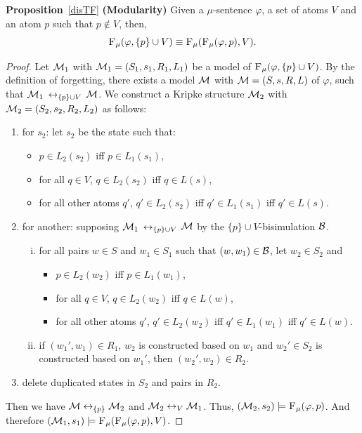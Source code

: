 \documentclass[runningheads]{llncs}
\begin{document}
\noindent\textbf{Proposition}~\ref{disTF} \textbf{(Modularity)} Given a $\mu$-sentence $\varphi$, a set of atoms $V$ and an atom $p$ such that $p \notin V$, then,
 \[
 {\textsc{F}_{\textsc{$\mu$}}}(\varphi, \{p\} \cup V) \equiv {\textsc{F}_{\textsc{$\mu$}}}({\textsc{F}_{\textsc{$\mu$}}}(\varphi, p), V).
 \]
 \begin{proof}
 Let ${\cal M}_1 $ with ${\cal M}_1=(S_1, s_1, R_1, L_1)$ be a model of ${\textsc{F}_{\textsc{$\mu$}}}(\varphi, \{p\} \cup V)$. By the definition of forgetting, there exists a model ${\cal M}$ with ${\cal M} = (S, s, R,L)$ of $\varphi$, such that ${\cal M}_1$ $\leftrightarrow_{\{p\} \cup V}$ ${\cal M}$. We construct a Kripke structure ${\cal M}_2$ with ${\cal M}_2 = (S_2, s_2, R_2, L_2)$ as follows:
 \begin{enumerate}[(1)]
   \item for $s_2$: let $s_2$ be the state such that:
   \begin{itemize}
     \item $p \in L_2(s_2)$ iff $p \in L_1(s_1)$,
     \item for all $q \in V$, $q \in L_2(s_2)$ iff $q\in L(s)$,
     \item for all other atoms $q'$, $q' \in L_2(s_2)$ iff $q' \in L_1(s_1)$ iff $q'\in L(s)$.
   \end{itemize}
   \item for another: supposing ${\cal M}_1$ $\leftrightarrow_{\{p\} \cup V}$ ${\cal M}$ by the $\{p\} \cup V$-bisimulation ${\cal B}$.
   \begin{enumerate}[(i)]
     \item for all pairs  $w \in S$ and $w_1 \in S_1$ such that $(w,w_1)\in {\cal B}$, let $w_2 \in S_2$ and
         \begin{itemize}
           \item $p \in L_2(w_2)$ iff $p \in L_1(w_1)$,
           \item for all $q \in V$, $q \in L_2(w_2)$ iff $q\in L(w)$,
           \item for all other atoms $q'$, $q' \in L_2(w_2)$ iff $q' \in L_1(w_1)$ iff $q'\in L(w)$.
         \end{itemize}
     \item if $(w_1', w_1)\in R_1$, $w_2$ is constructed based on $w_1$ and $w_2'\in S_2$ is constructed based on $w_1'$, then $(w_2', w_2)\in R_2$.
   \end{enumerate}
   \item delete duplicated states in $S_2$ and pairs in $R_2$.
 \end{enumerate}
 Then we have ${\cal M} \leftrightarrow_{\{p\}} {\cal M}_2$ and ${\cal M}_2 \leftrightarrow_V {\cal M}_1$. Thus, $({\cal M}_2, s_2) \models {\textsc{F}_{\textsc{$\mu$}}}(\varphi, p)$. And therefore $({\cal M}_1, s_1) \models {\textsc{F}_{\textsc{$\mu$}}}({\textsc{F}_{\textsc{$\mu$}}}(\varphi, p), V)$.


\end{proof}
\end{document}
